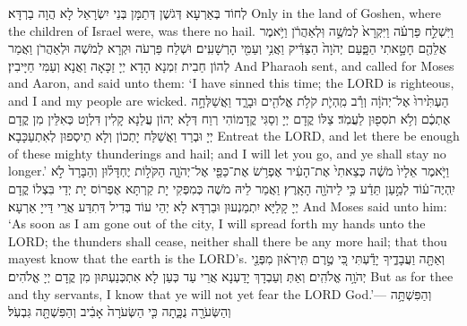 {{לְחוֹד בְּאַרְעָא דְּגֹשֶׁן דְּתַמָּן בְּנֵי יִשְׂרָאֵל לָא הֲוָה בַרְדָּא׃}
{Only in the land of Goshen, where the children of Israel were, was there no hail.}{}
{וַיִּשְׁלַ֣ח פַּרְעֹ֗ה וַיִּקְרָא֙ לְמֹשֶׁ֣ה וּֽלְאַהֲרֹ֔ן וַיֹּ֥אמֶר אֲלֵהֶ֖ם חָטָ֣אתִי הַפָּ֑עַם יְהֹוָה֙ הַצַּדִּ֔יק וַאֲנִ֥י וְעַמִּ֖י הָרְשָׁעִֽים׃}
{וּשְׁלַח פַּרְעֹה וּקְרָא לְמֹשֶׁה וּלְאַהֲרֹן וַאֲמַר לְהוֹן חַבִית זִמְנָא הָדָא יְיָ זַכָּאָה וַאֲנָא וְעַמִּי חַיָּיבִין׃}
{And Pharaoh sent, and called for Moses and Aaron, and said unto them: ‘I have sinned this time; the LORD is righteous, and I and my people are wicked.}{}
{הַעְתִּ֙ירוּ֙ אֶל־יְהֹוָ֔ה וְרַ֕ב מִֽהְיֹ֛ת קֹלֹ֥ת אֱלֹהִ֖ים וּבָרָ֑ד וַאֲשַׁלְּחָ֣ה אֶתְכֶ֔ם וְלֹ֥א תֹסִפ֖וּן לַעֲמֹֽד׃
}
{צַלּוֹ קֳדָם יְיָ וְסַגִּי קֳדָמוֹהִי רְוַח דְּלָא יְהוֹן עֲלַנָא קָלִין דִּלְוָט כְּאִלֵּין מִן קֳדָם יְיָ וּבְרַד וַאֲשַׁלַּח יָתְכוֹן וְלָא תֵיסְפוּן לְאִתְעַכָּבָא׃}
{Entreat the LORD, and let there be enough of these mighty thunderings and hail; and I will let you go, and ye shall stay no longer.’}{}
{וַיֹּ֤אמֶר אֵלָיו֙ מֹשֶׁ֔ה כְּצֵאתִי֙ אֶת־הָעִ֔יר אֶפְרֹ֥שׂ אֶת־כַּפַּ֖י אֶל־יְהֹוָ֑ה הַקֹּל֣וֹת יֶחְדָּל֗וּן וְהַבָּרָד֙ לֹ֣א יִֽהְיֶה־ע֔וֹד לְמַ֣עַן תֵּדַ֔ע כִּ֥י לַיהֹוָ֖ה הָאָֽרֶץ׃
}
{וַאֲמַר לֵיהּ מֹשֶׁה כְּמִפְּקִי יָת קַרְתָּא אֶפְרוֹס יָת יְדַי בִּצְלוֹ קֳדָם יְיָ קָלַיָּא יִתְמַנְעוּן וּבַרְדָּא לָא יְהֵי עוֹד בְּדִיל דְּתִדַּע אֲרֵי דַּייָ אַרְעָא׃}
{And Moses said unto him: ‘As soon as I am gone out of the city, I will spread forth my hands unto the LORD; the thunders shall cease, neither shall there be any more hail; that thou mayest know that the earth is the LORD’s.}{}
{וְאַתָּ֖ה וַעֲבָדֶ֑יךָ יָדַ֕עְתִּי כִּ֚י טֶ֣רֶם תִּֽירְא֔וּן מִפְּנֵ֖י יְהֹוָ֥ה אֱלֹהִֽים׃
}
{וְאַתְּ וְעַבְדָךְ יָדַעְנָא אֲרֵי עַד כְּעַן לָא אִתְכְּנַעְתּוּן מִן קֳדָם יְיָ אֱלֹהִים׃}
{But as for thee and thy servants, I know that ye will not yet fear the LORD God.’—}{}
{וְהַפִּשְׁתָּ֥ה וְהַשְּׂעֹרָ֖ה נֻכָּ֑תָה כִּ֤י הַשְּׂעֹרָה֙ אָבִ֔יב וְהַפִּשְׁתָּ֖ה גִּבְעֹֽל׃
}}
